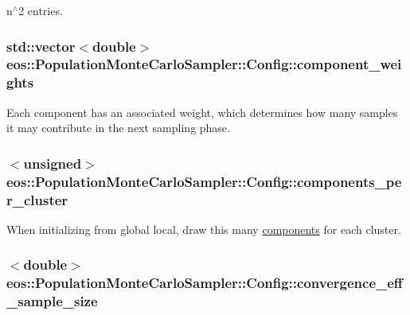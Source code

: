 n$^\wedge$2 entries. \hypertarget{structeos_1_1PopulationMonteCarloSampler_1_1Config_a95aeae5fe77255d4fa0c2c5ddfafe883}{
\subsubsection[{component\_\-weights}]{\setlength{\rightskip}{0pt plus 5cm}std::vector$<$double$>$ {\bf eos::PopulationMonteCarloSampler::Config::component\_\-weights}}}
\label{structeos_1_1PopulationMonteCarloSampler_1_1Config_a95aeae5fe77255d4fa0c2c5ddfafe883}
Each component has an associated weight, which determines how many samples it may contribute in the next sampling phase. \hypertarget{structeos_1_1PopulationMonteCarloSampler_1_1Config_a46afc1c26737e35c8ea582ffbab80edb}{
\subsubsection[{components\_\-per\_\-cluster}]{$<$unsigned$>$ {\bf eos::PopulationMonteCarloSampler::Config::components\_\-per\_\-cluster}}}
\label{structeos_1_1PopulationMonteCarloSampler_1_1Config_a46afc1c26737e35c8ea582ffbab80edb}
When initializing from global local, draw this many \hyperlink{namespaceeos_1_1components}{components} for each cluster. \hypertarget{structeos_1_1PopulationMonteCarloSampler_1_1Config_a69a93bb57d6610e06ea2f200e3d2ce42}{
\subsubsection[{convergence\_\-eff\_\-sample\_\-size}]{$<$double$>$ {\bf eos::PopulationMonteCarloSampler::Config::convergence\_\-eff\_\-sample\_\-size}}}
\label{structeos_1_1PopulationMonteCarloSampler_1_1Config_a69a93bb57d6610e06ea2f200e3d2ce42}


